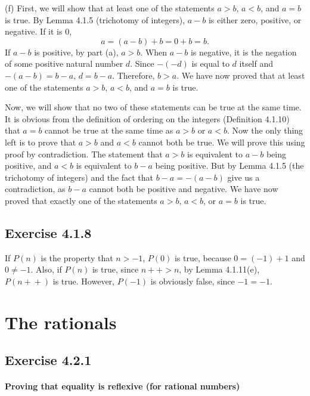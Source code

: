 \documentclass[12pt, oneside]{book}
\newcommand{\increment}{\! + \! +}
\begin{document}
	\bigskip
	\noindent (f) First, we will show that at least one of the statements $a > b$, $a < b$, and $a = b$ is true. By Lemma 4.1.5 (trichotomy of integers), $a - b$ is either zero, positive, or negative. If it is $0$, \[a = (a - b) + b = 0 + b = b.\] If $a - b$ is positive, by part (a), $a > b$. When $a - b$ is negative, it is the negation of some positive natural number $d$. Since $-(-d)$ is equal to $d$ itself and $-(a - b) = b - a$, $d = b - a$. Therefore, $b > a$. We have now proved that at least one of the statements $a > b$, $a < b$, and $a = b$ is true.
	
	Now, we will show that no two of these statements can be true at the same time. It is obvious from the definition of ordering on the integers (Definition 4.1.10) that $a = b$ cannot be true at the same time as $a > b$ or $a < b$. Now the only thing left is to prove that $a > b$ and $a < b$ cannot both be true. We will prove this using proof by contradiction. The statement that $a > b$ is equivalent to $a - b$ being positive, and $a < b$ is equivalent to $b - a$ being positive. But by Lemma 4.1.5 (the trichotomy of integers) and the fact that $b - a = -(a - b)$ give us a contradiction, as $b - a$ cannot both be positive and negative. We have now proved that exactly one of the statements $a > b$, $a < b$, or $a = b$ is true.
	
	\subsection*{Exercise 4.1.8}
	
	If $P(n)$ is the property that $n > -1$, $P(0)$ is true, because $0 = (-1) + 1$ and $0 \ne -1$. Also, if $P(n)$ is true, since $n \increment > n$, by Lemma 4.1.11(e), $P(n \increment)$ is true. However, $P(-1)$ is obviously false, since $-1 = -1$.
	
	\section{The rationals}
	
	\subsection*{Exercise 4.2.1}
	
	\paragraph*{Proving that equality is reflexive (for rational numbers)}
	
\end{document}

